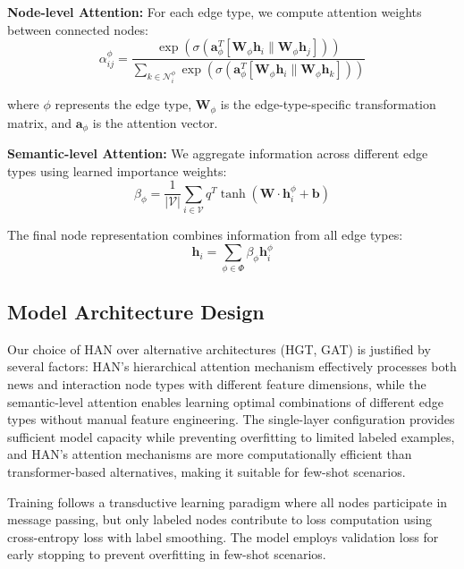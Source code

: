 \textbf{Node-level Attention:} For each edge type, we compute attention weights between connected nodes:
\begin{equation}
\alpha_{ij}^{\phi} = \frac{\exp(\sigma(\mathbf{a}_{\phi}^T[\mathbf{W}_{\phi}\mathbf{h}_i \| \mathbf{W}_{\phi}\mathbf{h}_j]))}{\sum_{k \in \mathcal{N}_i^{\phi}} \exp(\sigma(\mathbf{a}_{\phi}^T[\mathbf{W}_{\phi}\mathbf{h}_i \| \mathbf{W}_{\phi}\mathbf{h}_k]))}
\end{equation}

where $\phi$ represents the edge type, $\mathbf{W}_{\phi}$ is the edge-type-specific transformation matrix, and $\mathbf{a}_{\phi}$ is the attention vector.

\textbf{Semantic-level Attention:} We aggregate information across different edge types using learned importance weights:
\begin{equation}
\beta_{\phi} = \frac{1}{|\mathcal{V}|} \sum_{i \in \mathcal{V}} q^T \tanh(\mathbf{W} \cdot \mathbf{h}_i^{\phi} + \mathbf{b})
\end{equation}

The final node representation combines information from all edge types:
\begin{equation}
\mathbf{h}_i = \sum_{\phi \in \Phi} \beta_{\phi} \mathbf{h}_i^{\phi}
\end{equation}

\subsection{Model Architecture Design}

Our choice of HAN over alternative architectures (HGT, GAT) is justified by several factors: HAN's hierarchical attention mechanism effectively processes both news and interaction node types with different feature dimensions, while the semantic-level attention enables learning optimal combinations of different edge types without manual feature engineering. The single-layer configuration provides sufficient model capacity while preventing overfitting to limited labeled examples, and HAN's attention mechanisms are more computationally efficient than transformer-based alternatives, making it suitable for few-shot scenarios.

Training follows a transductive learning paradigm where all nodes participate in message passing, but only labeled nodes contribute to loss computation using cross-entropy loss with label smoothing. The model employs validation loss for early stopping to prevent overfitting in few-shot scenarios.

\EndChapter
